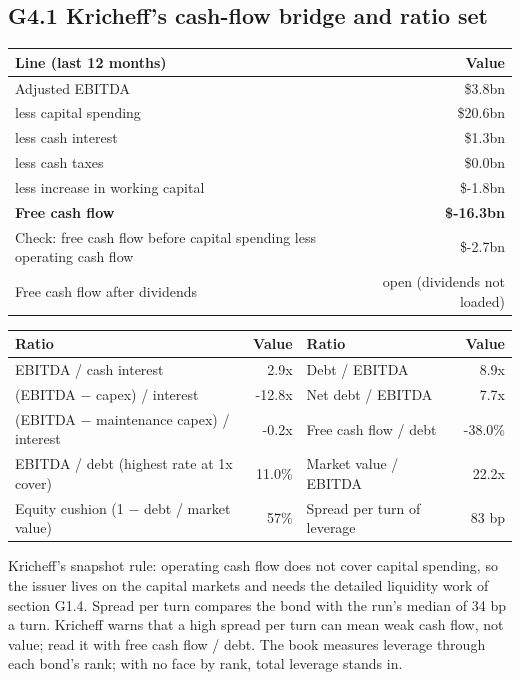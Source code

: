 \documentclass[11pt,a4paper]{article}
\begin{document}
\subsection*{G4.1 Kricheff's cash-flow bridge and ratio set}
\begin{center}\footnotesize\setlength{\tabcolsep}{3.5pt}\begin{tabular}{@{}lr@{}}\toprule
Line (last 12 months) & Value \\\midrule
Adjusted EBITDA & \$3.8bn \\
less capital spending & \$20.6bn \\
less cash interest & \$1.3bn \\
less cash taxes & \$0.0bn \\
less increase in working capital & \$-1.8bn \\
\textbf{Free cash flow} & \textbf{\$-16.3bn} \\
Check: free cash flow before capital spending less operating cash flow & \$-2.7bn \\
Free cash flow after dividends & open (dividends not loaded) \\
\bottomrule\end{tabular}\end{center}
\begin{center}\footnotesize\setlength{\tabcolsep}{3.5pt}\begin{tabular}{@{}lrlr@{}}\toprule
Ratio & Value & Ratio & Value \\\midrule
EBITDA / cash interest & 2.9x & Debt / EBITDA & 8.9x \\
(EBITDA $-$ capex) / interest & -12.8x & Net debt / EBITDA & 7.7x \\
(EBITDA $-$ maintenance capex) / interest & -0.2x & Free cash flow / debt & -38.0\% \\
EBITDA / debt (highest rate at 1x cover) & 11.0\% & Market value / EBITDA & 22.2x \\
Equity cushion (1 $-$ debt / market value) & 57\% & Spread per turn of leverage & 83 bp \\
\bottomrule\end{tabular}\end{center}
Kricheff's snapshot rule: operating cash flow does not cover capital spending, so the issuer lives on the capital markets and needs the detailed liquidity work of section G1.4. Spread per turn compares the bond with the run's median of 34 bp a turn. Kricheff warns that a high spread per turn can mean weak cash flow, not value; read it with free cash flow / debt. The book measures leverage through each bond's rank; with no face by rank, total leverage stands in.
\end{document}
